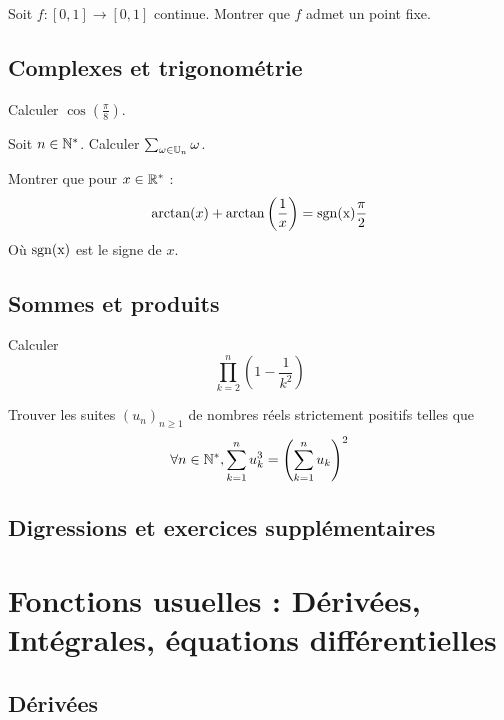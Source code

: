 \documentclass[12pt,a4paper]{exo_book}
\begin{document}
\begin{exo}
    Soit $f : [0,1] \to [0,1]$ continue. Montrer que $f$ admet un point fixe.
\end{exo}

\section{Complexes et trigonométrie}

\begin{exo}
    Calculer $\cos\left(\frac{\pi}{8}\right)$.
\end{exo}

\begin{exo}
    Soit $n \in \mathbb{N}^*$. Calculer $\sum_{\omega \in \mathbb{U}_n} \omega$.
\end{exo}

\begin{exo}
    Montrer que pour $x \in \mathbb{R}^*$ :
    \[\arctan(x) + \arctan\left(\frac{1}{x}\right) = \rm{sgn}(x) \frac{\pi}{2}\]
    Où $\rm{sgn}(x)$ est le signe de $x$.
\end{exo}

\section{Sommes et produits}

\begin{exo}
    Calculer
    \[
    \prod_{k=2}^{n} \left( 1 - \frac{1}{k^2} \right)
    \]
\end{exo}

\begin{exo}
    Trouver les suites $(u_n)_{n\ge1}$ de nombres réels strictement positifs telles que
    \[
    \forall n \in \mathbb{N}^*, \sum_{k=1}^n u_k^3 = \left( \sum_{k=1}^n u_k \right)^2
    \]
\end{exo}

\section{Digressions et exercices supplémentaires}

\chapter{Fonctions usuelles : Dérivées, Intégrales, équations différentielles}

\section{Dérivées}
\end{document}
